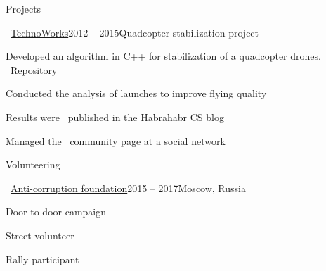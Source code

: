 \documentclass{resume} %
\begin{document}
\begin{rSection}{Projects}
\begin{rSubsection}{\faExternalLink~\href{http://web.archive.org/web/20150626102512/http://technoworks.ru:80/}{TechnoWorks}}{2012 -- 2015}{Quadcopter stabilization project}{}
\item Developed an algorithm in C++ for stabilization of a quadcopter drones. \faExternalLink~\href{https://github.com/it-workshop/Quadrocopter}{Repository}
\item Conducted the analysis of launches to improve flying quality
\item Results were \faExternalLink~\href{http://web.archive.org/web/20141016114551/http://habrahabr.ru/company/technoworks/blog/216437/}{published} in the Habrahabr CS blog
\item Managed the \faExternalLink~\href{https://vk.com/technoworks}{community page} at a social network
\end{rSubsection}
\end{rSection}

\begin{rSection}{Volunteering}
	\begin{rSubsection}{\faExternalLink~\href{https://fbk.info/english/about/}{Anti-corruption foundation}}{2015 -- 2017}{Moscow, Russia}{}
		\item Door-to-door campaign
		\item Street volunteer
		\item Rally participant
	\end{rSubsection}
\end{rSection}

\end{document}
